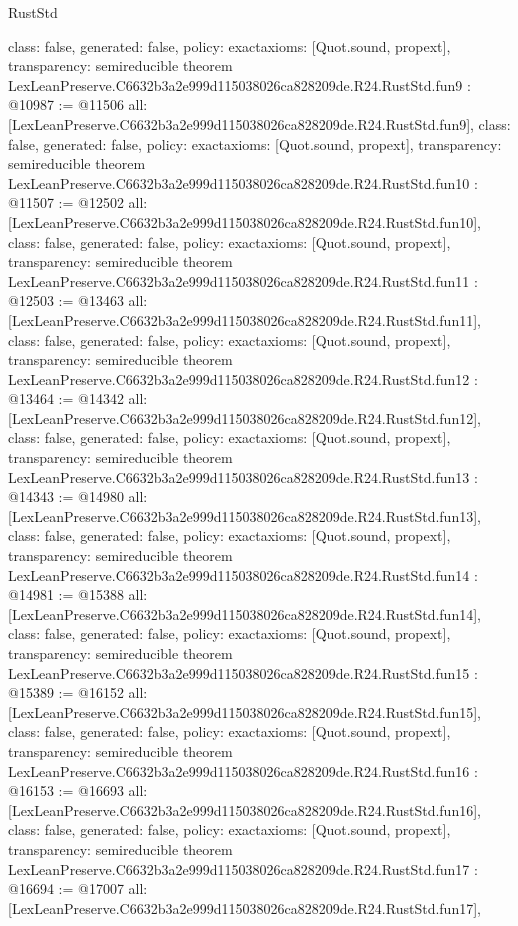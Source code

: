 \begin{lexlean}{RustStd}
\begin{coremodule}
{  class: false,
  generated: false,
  policy: exact{axioms: [Quot.sound, propext]},
  transparency: semireducible
}
theorem LexLeanPreserve.C6632b3a2e999d115038026ca828209de.R24.RustStd.fun9 : @10987 := @11506 {
  all: [LexLeanPreserve.C6632b3a2e999d115038026ca828209de.R24.RustStd.fun9],
  class: false,
  generated: false,
  policy: exact{axioms: [Quot.sound, propext]},
  transparency: semireducible
}
theorem LexLeanPreserve.C6632b3a2e999d115038026ca828209de.R24.RustStd.fun10 : @11507 := @12502 {
  all: [LexLeanPreserve.C6632b3a2e999d115038026ca828209de.R24.RustStd.fun10],
  class: false,
  generated: false,
  policy: exact{axioms: [Quot.sound, propext]},
  transparency: semireducible
}
theorem LexLeanPreserve.C6632b3a2e999d115038026ca828209de.R24.RustStd.fun11 : @12503 := @13463 {
  all: [LexLeanPreserve.C6632b3a2e999d115038026ca828209de.R24.RustStd.fun11],
  class: false,
  generated: false,
  policy: exact{axioms: [Quot.sound, propext]},
  transparency: semireducible
}
theorem LexLeanPreserve.C6632b3a2e999d115038026ca828209de.R24.RustStd.fun12 : @13464 := @14342 {
  all: [LexLeanPreserve.C6632b3a2e999d115038026ca828209de.R24.RustStd.fun12],
  class: false,
  generated: false,
  policy: exact{axioms: [Quot.sound, propext]},
  transparency: semireducible
}
theorem LexLeanPreserve.C6632b3a2e999d115038026ca828209de.R24.RustStd.fun13 : @14343 := @14980 {
  all: [LexLeanPreserve.C6632b3a2e999d115038026ca828209de.R24.RustStd.fun13],
  class: false,
  generated: false,
  policy: exact{axioms: [Quot.sound, propext]},
  transparency: semireducible
}
theorem LexLeanPreserve.C6632b3a2e999d115038026ca828209de.R24.RustStd.fun14 : @14981 := @15388 {
  all: [LexLeanPreserve.C6632b3a2e999d115038026ca828209de.R24.RustStd.fun14],
  class: false,
  generated: false,
  policy: exact{axioms: [Quot.sound, propext]},
  transparency: semireducible
}
theorem LexLeanPreserve.C6632b3a2e999d115038026ca828209de.R24.RustStd.fun15 : @15389 := @16152 {
  all: [LexLeanPreserve.C6632b3a2e999d115038026ca828209de.R24.RustStd.fun15],
  class: false,
  generated: false,
  policy: exact{axioms: [Quot.sound, propext]},
  transparency: semireducible
}
theorem LexLeanPreserve.C6632b3a2e999d115038026ca828209de.R24.RustStd.fun16 : @16153 := @16693 {
  all: [LexLeanPreserve.C6632b3a2e999d115038026ca828209de.R24.RustStd.fun16],
  class: false,
  generated: false,
  policy: exact{axioms: [Quot.sound, propext]},
  transparency: semireducible
}
theorem LexLeanPreserve.C6632b3a2e999d115038026ca828209de.R24.RustStd.fun17 : @16694 := @17007 {
  all: [LexLeanPreserve.C6632b3a2e999d115038026ca828209de.R24.RustStd.fun17],
}
\end{coremodule}
\end{lexlean}
